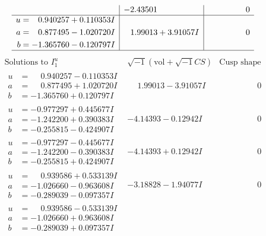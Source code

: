 \documentclass[1p]{elsarticle_modified}
\theoremstyle{definition}
\newcommand{\I}{\sqrt{-1}}
\begin{document}
$$\begin{array}{c|c|c}
 & -2.43501\phantom{ +0.000000I} & \phantom{-0.000000 } 0 \\ \hline\begin{aligned}
u &= \phantom{-}0.940257 + 0.110353 I \\
a &= \phantom{-}0.877495 - 1.020720 I \\
b &= -1.365760 - 0.120797 I\end{aligned}
 & \phantom{-}1.99013 + 3.91057 I & \phantom{-0.000000 } 0\\
 \hline 
 \end{array}$$\newpage$$\begin{array}{c|c|c}  
\text{Solutions to }I^u_{1}& \I (\text{vol} + \sqrt{-1}CS) & \text{Cusp shape}\\
 \hline 
\begin{aligned}
u &= \phantom{-}0.940257 - 0.110353 I \\
a &= \phantom{-}0.877495 + 1.020720 I \\
b &= -1.365760 + 0.120797 I\end{aligned}
 & \phantom{-}1.99013 - 3.91057 I & \phantom{-0.000000 } 0 \\ \hline\begin{aligned}
u &= -0.977297 + 0.445677 I \\
a &= -1.242200 + 0.390383 I \\
b &= -0.255815 - 0.424907 I\end{aligned}
 & -4.14393 - 0.12942 I & \phantom{-0.000000 } 0 \\ \hline\begin{aligned}
u &= -0.977297 - 0.445677 I \\
a &= -1.242200 - 0.390383 I \\
b &= -0.255815 + 0.424907 I\end{aligned}
 & -4.14393 + 0.12942 I & \phantom{-0.000000 } 0 \\ \hline\begin{aligned}
u &= \phantom{-}0.939586 + 0.533139 I \\
a &= -1.026660 - 0.963608 I \\
b &= -0.289039 - 0.097357 I\end{aligned}
 & -3.18828 - 1.94077 I & \phantom{-0.000000 } 0 \\ \hline\begin{aligned}
u &= \phantom{-}0.939586 - 0.533139 I \\
a &= -1.026660 + 0.963608 I \\
b &= -0.289039 + 0.097357 I\end{aligned}

\end{array}$$
\end{document}
